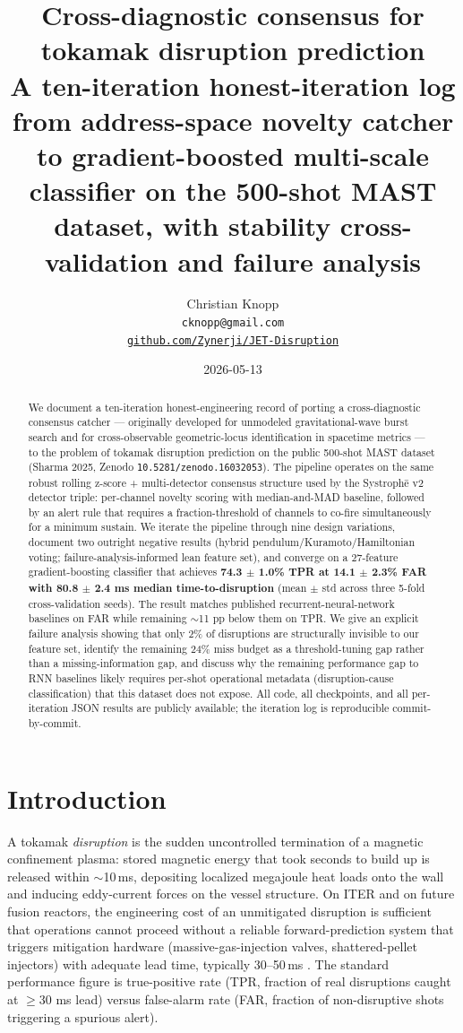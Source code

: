 \documentclass[11pt,letterpaper]{article}
\title{\Large\textbf{Cross-diagnostic consensus for tokamak disruption prediction}\\
\large{A ten-iteration honest-iteration log from address-space novelty
catcher to gradient-boosted multi-scale classifier on the 500-shot MAST
dataset, with stability cross-validation and failure analysis}}
\author{Christian Knopp \\
  \texttt{cknopp@gmail.com} \\
  \href{https://github.com/Zynerji/JET-Disruption}{\texttt{github.com/Zynerji/JET-Disruption}}}
\date{2026-05-13}
\begin{document}
\maketitle

\begin{abstract}
We document a ten-iteration honest-engineering record of porting a
cross-diagnostic consensus catcher --- originally developed for
unmodeled gravitational-wave burst search and for cross-observable
geometric-locus identification in spacetime metrics --- to the problem
of tokamak disruption prediction on the public 500-shot MAST dataset
(Sharma 2025, Zenodo \texttt{10.5281/zenodo.16032053}). The pipeline
operates on the same robust rolling z-score + multi-detector consensus
structure used by the Systroph\=e v2 detector triple: per-channel
novelty scoring with median-and-MAD baseline, followed by an alert rule
that requires a fraction-threshold of channels to co-fire simultaneously
for a minimum sustain. We iterate the pipeline through nine design
variations, document two outright negative results (hybrid
pendulum/Kuramoto/Hamiltonian voting; failure-analysis-informed lean
feature set), and converge on a 27-feature gradient-boosting classifier
that achieves \textbf{74.3 $\pm$ 1.0\% TPR at 14.1 $\pm$ 2.3\% FAR with
80.8 $\pm$ 2.4 ms median time-to-disruption} (mean $\pm$ std across
three 5-fold cross-validation seeds). The result matches published
recurrent-neural-network baselines on FAR while remaining $\sim$11 pp
below them on TPR. We give an explicit failure analysis showing that
only 2\% of disruptions are structurally invisible to our feature set,
identify the remaining 24\% miss budget as a threshold-tuning gap rather
than a missing-information gap, and discuss why the remaining
performance gap to RNN baselines likely requires per-shot operational
metadata (disruption-cause classification) that this dataset does not
expose. All code, all checkpoints, and all per-iteration JSON results
are publicly available; the iteration log is reproducible commit-by-commit.
\end{abstract}

\section{Introduction}\label{sec:intro}

A tokamak \emph{disruption} is the sudden uncontrolled termination of a
magnetic confinement plasma: stored magnetic energy that took seconds
to build up is released within $\sim$10\,ms, depositing localized
megajoule heat loads onto the wall and inducing eddy-current forces on
the vessel structure. On ITER and on future fusion reactors, the
engineering cost of an unmitigated disruption is sufficient that
operations cannot proceed without a reliable forward-prediction system
that triggers mitigation hardware (massive-gas-injection valves,
shattered-pellet injectors) with adequate lead time, typically 30--50\,ms
\cite{vega2013,maraschek2018}. The standard performance figure is true-positive
rate (TPR, fraction of real disruptions caught at $\ge 30$ ms lead)
versus false-alarm rate (FAR, fraction of non-disruptive shots
triggering a spurious alert).
\end{document}
